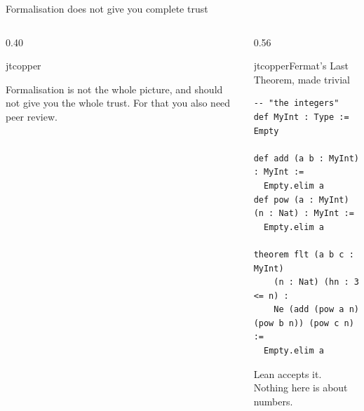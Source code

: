 \documentclass[aspectratio=169,10pt]{beamer}
\begin{document}
\begin{frame}[fragile]{Formalisation does not give you complete trust}
  \vfill
  \begin{columns}[T,onlytextwidth]

    \begin{column}{0.40\textwidth}
      \begin{jtquote}[top=12pt,bottom=12pt]{jtcopper}
        {\fontsize{14}{19}\selectfont\color{jtslate}%
          Formalisation is not the whole picture, and should not give you
          the whole trust. For that you also need peer review.\par}
      \end{jtquote}
    \end{column}

    \begin{column}{0.56\textwidth}
      \begin{jtblockcap}[top=5pt,bottom=3pt]{jtcopper}{Fermat's Last Theorem, made trivial}
\begin{lstlisting}
-- "the integers"
def MyInt : Type := Empty

def add (a b : MyInt) : MyInt :=
  Empty.elim a
def pow (a : MyInt) (n : Nat) : MyInt :=
  Empty.elim a

theorem flt (a b c : MyInt)
    (n : Nat) (hn : 3 <= n) :
    Ne (add (pow a n) (pow b n)) (pow c n) :=
  Empty.elim a
\end{lstlisting}
      \end{jtblockcap}
      \vspace{2pt}
      {\fontsize{8}{10}\selectfont\color{jtgrey}%
        Lean accepts it. Nothing here is about numbers.\par}
    \end{column}

  \end{columns}
  \vfill
\end{frame}
\end{document}
